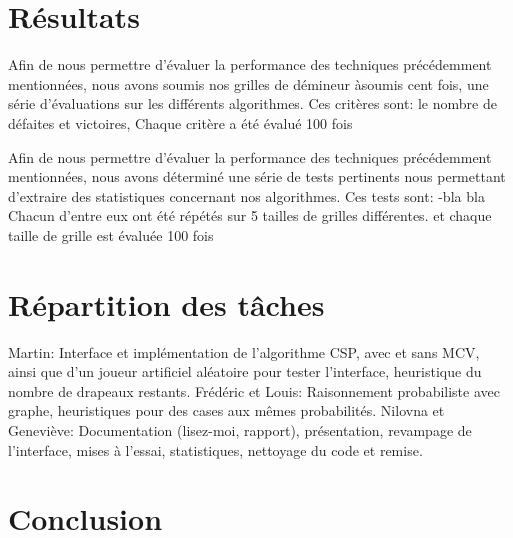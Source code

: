 \documentclass{article}
\begin{document}
\section{Résultats}
Afin de nous permettre d’évaluer la performance des techniques précédemment mentionnées, nous avons
soumis nos grilles de démineur àsoumis cent fois, une série d’évaluations sur les différents
algorithmes. Ces critères sont: le nombre de défaites et victoires, Chaque critère a été évalué 100
fois 

Afin de nous permettre d’évaluer la performance des techniques précédemment mentionnées, nous avons
déterminé une série de tests pertinents nous permettant d’extraire des statistiques concernant nos
algorithmes. Ces tests sont:
-bla bla
Chacun d’entre eux ont été répétés sur 5 tailles de grilles différentes. et chaque taille de grille
est évaluée 100 fois

\section{Répartition des tâches}
Martin: Interface et implémentation de l’algorithme CSP, avec et sans MCV, ainsi que d’un joueur
artificiel aléatoire pour tester l’interface, heuristique du nombre de drapeaux restants. 
Frédéric et Louis: Raisonnement probabiliste avec graphe, heuristiques pour des cases aux mêmes
probabilités.
Nilovna et Geneviève: Documentation (lisez-moi, rapport), présentation, revampage de l’interface,
mises à l’essai, statistiques, nettoyage du code et remise.


\section{Conclusion}
\end{document}
